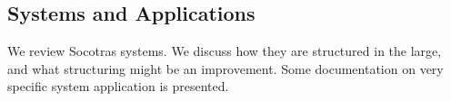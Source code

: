 
\begin{partbacktext}
\part{Systems and Applications}
\noindent We review Socotras systems. We discuss how they are structured in the large, and what structuring might be an improvement.
Some documentation on very specific system application is presented.

\end{partbacktext}
